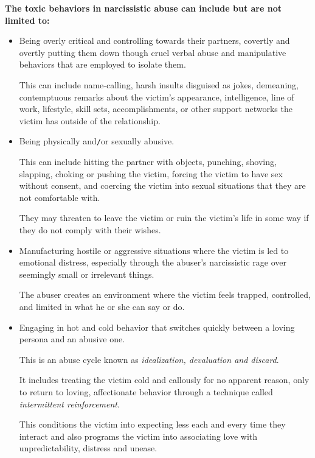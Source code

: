 \documentclass[oneside]{book}
\numberwithin{equation}{section}
\begin{document}
%
\textbf{The toxic behaviors in narcissistic abuse can include but are not limited to:}
\begin{itemize}
    \item Being overly critical and controlling towards their partners, covertly and overtly putting them down though cruel verbal abuse and manipulative behaviors that are employed to isolate them.
    
    This can include name-calling, harsh insults disguised as jokes, demeaning, contemptuous remarks about the victim's appearance, intelligence, line of work, lifestyle, skill sets, accomplishments, or other support networks the victim has outside of the relationship.
    \item Being physically and\texttt{/}or sexually abusive.
    
    This can include hitting the partner with objects, punching, shoving, slapping, choking or pushing the victim, forcing the victim to have sex without consent, and coercing the victim into sexual situations that they are not comfortable with.
    
    They may threaten to leave the victim or ruin the victim's life in some way if they do not comply with their wishes.
    \item Manufacturing hostile or aggressive situations where the victim is led to emotional distress, especially through the abuser's narcissistic rage over seemingly small or irrelevant things.
    
    The abuser creates an environment where the victim feels trapped, controlled, and limited in what he or she can say or do.
    \item Engaging in hot and cold behavior that switches quickly between a loving persona and an abusive one.
    
    This is an abuse cycle known as \textit{idealization, devaluation and discard}.
    
    It includes treating the victim cold and callously for no apparent reason, only to return to loving, affectionate behavior through a technique called \textit{intermittent reinforcement}.
    
    This conditions the victim into expecting less each and every time they interact and also programs the victim into associating love with unpredictability, distress and unease.
    

\end{itemize}
\end{document}
